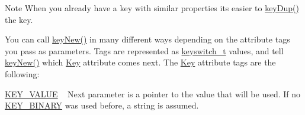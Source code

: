 \begin{DoxyNote}{Note}
When you already have a key with similar properties its easier to \mbox{\hyperlink{group__key_gae6ec6a60cc4b8c1463fa08623d056ce3}{key\+Dup()}} the key.
\end{DoxyNote}
You can call \mbox{\hyperlink{group__key_gad23c65b44bf48d773759e1f9a4d43b89}{key\+New()}} in many different ways depending on the attribute tags you pass as parameters. Tags are represented as \mbox{\hyperlink{group__key_ga91fb3178848bd682000958089abbaf40}{keyswitch\+\_\+t}} values, and tell \mbox{\hyperlink{group__key_gad23c65b44bf48d773759e1f9a4d43b89}{key\+New()}} which \mbox{\hyperlink{classkdb_1_1Key}{Key}} attribute comes next. The \mbox{\hyperlink{classkdb_1_1Key}{Key}} attribute tags are the following\+:
\begin{DoxyItemize}
\item \mbox{\hyperlink{group__key_gga91fb3178848bd682000958089abbaf40ac66e4a49d09212b79f5754ca6db5bd2e}{K\+E\+Y\+\_\+\+V\+A\+L\+UE}} ~\newline
 Next parameter is a pointer to the value that will be used. If no \mbox{\hyperlink{group__key_gga91fb3178848bd682000958089abbaf40a1ca18d4e094ae7487d35ecedda2235ff}{K\+E\+Y\+\_\+\+B\+I\+N\+A\+RY}} was used before, a string is assumed. 
\begin{DoxyCodeInclude}{0}
\DoxyCodeLine{\textcolor{comment}{// Create and initialize a key with a name and nothing else}}
\end{DoxyCodeInclude}


\end{DoxyItemize}
